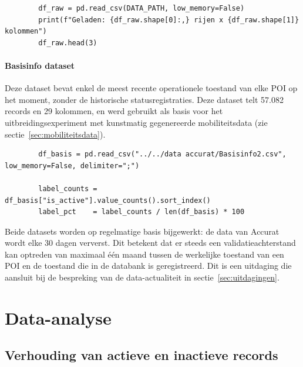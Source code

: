 \begin{listing}[H]
    \begin{verbatim}
        df_raw = pd.read_csv(DATA_PATH, low_memory=False)
        print(f"Geladen: {df_raw.shape[0]:,} rijen x {df_raw.shape[1]} kolommen")
        df_raw.head(3)
    \end{verbatim}
    \caption[Data inladen]{Inladen van de historische dataset.}
\end{listing}

\paragraph{Basisinfo dataset}
Deze dataset bevat enkel de meest recente operationele toestand van elke POI op het moment, zonder de historische statusregistraties. Deze dataset telt 57.082 records en 29 kolommen, en werd gebruikt als basis voor het uitbreidingsexperiment met kunstmatig gegenereerde mobiliteitsdata (zie sectie~\ref{sec:mobiliteitsdata}).

\begin{listing}[H]
    \begin{verbatim}
        df_basis = pd.read_csv("../../data accurat/Basisinfo2.csv", low_memory=False, delimiter=";")
        
        label_counts = df_basis["is_active"].value_counts().sort_index()
        label_pct    = label_counts / len(df_basis) * 100
    \end{verbatim}
    \caption[Inladen Basisinfo-dataset]{Inladen van de basisinfo-dataset gebruikt als basis voor het mobiliteitsexperiment.}
\end{listing}

\vspace{1em}

Beide datasets worden op regelmatige basis bijgewerkt: de data van Accurat wordt elke 30 dagen ververst. Dit betekent dat er steeds een validatieachterstand kan optreden van maximaal één maand tussen de werkelijke toestand van een POI en de toestand die in de databank is geregistreerd. Dit is een uitdaging die aansluit bij de bespreking van de data-actualiteit in sectie~\ref{sec:uitdagingen}.

\section{Data-analyse}

\subsection{Verhouding van actieve en inactieve records}

